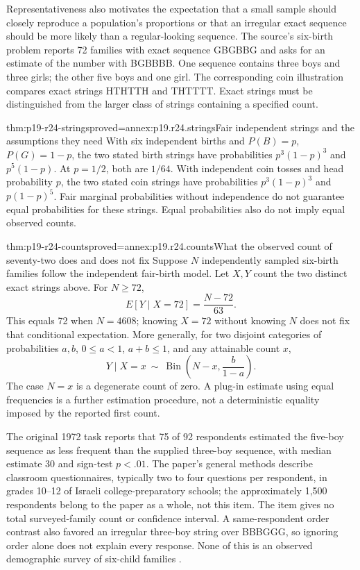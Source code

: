 Representativeness also motivates the expectation that a small sample
should closely reproduce a population's proportions or that an irregular
exact sequence should be more likely than a regular-looking sequence.
The source's six-birth problem reports 72 families with exact sequence
GBGBBG and asks for an estimate of the number with BGBBBB. One sequence
contains three boys and three girls; the other five boys and one girl.
The corresponding coin illustration compares exact strings HTHTTH and
THTTTT. Exact strings must be distinguished from the larger class of
strings containing a specified count.

\begin{hbtheorem}{thm:p19-r24-strings}{proved=annex:p19.r24.strings}{Fair independent strings and the assumptions they need}
With six independent births and \(P(B)=p\), \(P(G)=1-p\),
the two stated birth strings have probabilities
\(p^3(1-p)^3\) and \(p^5(1-p)\). At \(p=1/2\), both
are \(1/64\). With independent coin tosses and head probability
\(p\), the two stated coin strings have probabilities
\(p^3(1-p)^3\) and \(p(1-p)^5\).
Fair marginal probabilities without independence do not guarantee
equal probabilities for these strings. Equal probabilities also do
not imply equal observed counts.
\end{hbtheorem}

\begin{hbtheorem}{thm:p19-r24-counts}{proved=annex:p19.r24.counts}{What the observed count of seventy-two does and does not fix}
Suppose \(N\) independently sampled six-birth families follow the
independent fair-birth model. Let \(X,Y\) count the two distinct
exact strings above. For \(N\geq72\),
\[
 E[Y\mid X=72]=\frac{N-72}{63}.
\]
This equals 72 when \(N=4608\); knowing \(X=72\) without knowing
\(N\) does not fix that conditional expectation. More generally,
for two disjoint categories of probabilities \(a,b\),
\(0\leq a<1\), \(a+b\leq1\), and any attainable count \(x\),
\[
 Y\mid X=x\ \sim\ \operatorname{Bin}
             \left(N-x,\frac{b}{1-a}\right).
\]
The case \(N=x\) is a degenerate count of zero. A plug-in estimate
using equal frequencies is a further estimation procedure, not a
deterministic equality imposed by the reported first count.
\end{hbtheorem}

The original 1972 task reports that 75 of 92 respondents estimated the
five-boy sequence as less frequent than the supplied three-boy sequence,
with median estimate 30 and sign-test \(p<.01\). The paper's general
methods describe classroom questionnaires, typically two to four
questions per respondent, in grades 10--12 of Israeli college-preparatory
schools; the approximately 1,500 respondents belong to the paper as a
whole, not this item. The item gives no total surveyed-family count or
confidence interval. A same-respondent order contrast also favored an
irregular three-boy string over BBBGGG, so ignoring order alone does not
explain every response. None of this is an observed demographic survey
of six-child families \cite[pp.~431--432]{KahnemanTversky1972Subjective}.

